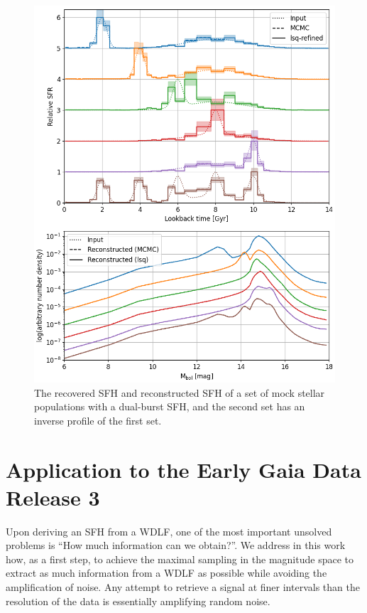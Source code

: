 \documentclass[fleqn,usenatbib]{mnras}
\begin{document}
\begin{figure}
  \includegraphics[width=\columnwidth]{figures/fig_02_two_bursts_wdlf.png} 
  \caption{The recovered SFH and reconstructed SFH of a set of mock stellar
  populations with a dual-burst SFH, and the second set has an inverse profile
  of the first set.}
  \label{fig:bursts_sfh}
\end{figure}


\section{Application to the Early Gaia Data Release 3}
Upon deriving an SFH from a WDLF, one of the most important unsolved problems
is ``How much information can we obtain?''. We address in this work how, as a
first step, to achieve the maximal sampling in the magnitude space to extract
as much information from a WDLF as possible while avoiding the amplification of
noise. Any attempt to retrieve a signal at finer intervals than the
resolution of the data is essentially amplifying random noise.
\end{document}
